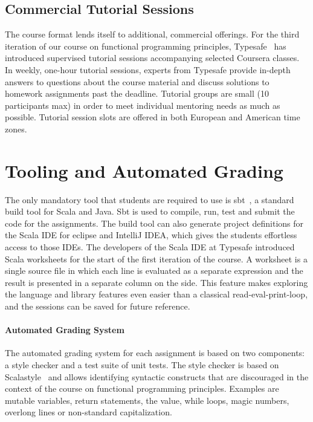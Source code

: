\documentclass{sig-alternate}
\begin{document}
\subsection{Commercial Tutorial Sessions}

The course format lends itself to additional, commercial offerings. For the
third iteration of our course on functional programming principles, Typesafe~\cite{typesafe}
has introduced supervised tutorial sessions accompanying selected Coursera
classes. In weekly, one-hour tutorial sessions, experts from Typesafe provide
in-depth answers to questions about the course material and discuss solutions
to homework assignments past the deadline. Tutorial groups are small (10
participants max) in order to meet individual mentoring needs as much as
possible. Tutorial session slots are offered in both European and American
time zones.

\section{Tooling and Automated Grading}
\label{sec:tooling-automated-grading}

The only mandatory tool that students are required to use is sbt~\cite{sbt}, a
standard build tool for Scala and Java. Sbt is used to compile, run, test and
submit the code for the assignments. The build tool can also generate project
definitions for the Scala IDE for eclipse and IntelliJ IDEA, which gives the
students effortless access to those IDEs. The developers of the Scala IDE at
Typesafe introduced Scala worksheets for the start of the first iteration
of the course. A worksheet is a single source file in which each line is
evaluated as a separate expression and the result is presented in a separate
column on the side. This feature makes exploring the language and library
features even easier than a classical read-eval-print-loop, and the sessions
can be saved for future reference.

\paragraph{Automated Grading System}

The automated grading system for each assignment is based on two components: a
style checker and a test suite of unit tests. The style checker is based on
Scalastyle~\cite{ScalaStyle} and allows identifying syntactic constructs that
are discouraged in the context of the course on functional programming principles.
Examples are mutable variables, return statements, the \lstinline@null@ value,
while loops, magic numbers, overlong lines or non-standard capitalization.
\end{document}
